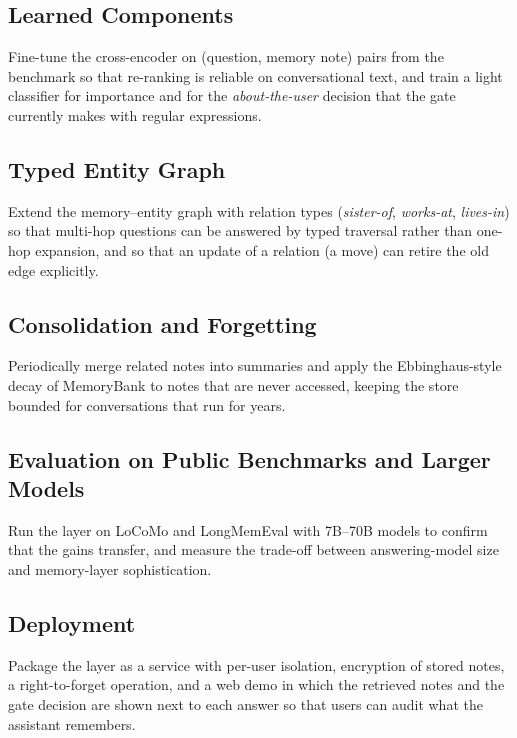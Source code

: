 \subsection{Learned Components}
Fine-tune the cross-encoder on (question, memory note) pairs from the benchmark so that re-ranking is
reliable on conversational text, and train a light classifier for importance and for the
\emph{about-the-user} decision that the gate currently makes with regular expressions.

\subsection{Typed Entity Graph}
Extend the memory--entity graph with relation types (\emph{sister-of}, \emph{works-at},
\emph{lives-in}) so that multi-hop questions can be answered by typed traversal rather than one-hop
expansion, and so that an update of a relation (a move) can retire the old edge explicitly.

\subsection{Consolidation and Forgetting}
Periodically merge related notes into summaries and apply the Ebbinghaus-style decay of MemoryBank to
notes that are never accessed, keeping the store bounded for conversations that run for years.

\subsection{Evaluation on Public Benchmarks and Larger Models}
Run the layer on LoCoMo and LongMemEval with 7B--70B models to confirm that the gains transfer, and
measure the trade-off between answering-model size and memory-layer sophistication.

\subsection{Deployment}
Package the layer as a service with per-user isolation, encryption of stored notes, a right-to-forget
operation, and a web demo in which the retrieved notes and the gate decision are shown next to each
answer so that users can audit what the assistant remembers.
